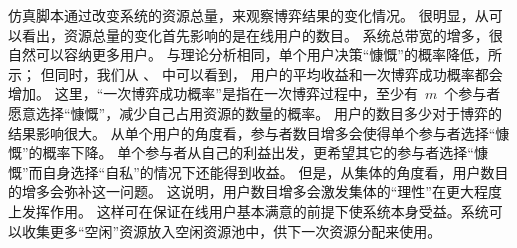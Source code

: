 仿真脚本通过改变系统的资源总量，来观察博弈结果的变化情况。
很明显，从可以看出，资源总量的变化首先影响的是在线用户的数目。
系统总带宽的增多，很自然可以容纳更多用户。
与理论分析相同，单个用户决策“慷慨”的概率降低，所示；
但同时，我们从
、
中可以看到，
用户的平均收益和一次博弈成功概率都会增加。
这里，“一次博弈成功概率”是指在一次博弈过程中，至少有~$m$~个参与者愿意选择“慷慨”，减少自己占用资源的数量的概率。
用户的数目多少对于博弈的结果影响很大。
从单个用户的角度看，参与者数目增多会使得单个参与者选择“慷慨”的概率下降。
单个参与者从自己的利益出发，更希望其它的参与者选择“慷慨”而自身选择“自私”的情况下还能得到收益。
但是，从集体的角度看，用户数目的增多会弥补这一问题。
这说明，用户数目增多会激发集体的“理性”在更大程度上发挥作用。
这样可在保证在线用户基本满意的前提下使系统本身受益。系统可以收集更多“空闲”资源放入空闲资源池中，供下一次资源分配来使用。
